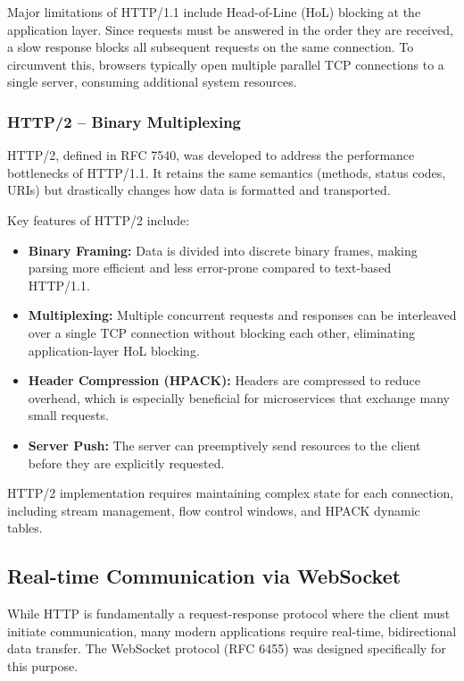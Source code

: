 Major limitations of HTTP/1.1 include Head-of-Line (HoL) blocking at the application layer. Since requests must be answered in the order they are received, a slow response blocks all subsequent requests on the same connection. To circumvent this, browsers typically open multiple parallel TCP connections to a single server, consuming additional system resources.

\subsubsection{HTTP/2 -- Binary Multiplexing}

HTTP/2, defined in RFC 7540, was developed to address the performance bottlenecks of HTTP/1.1. It retains the same semantics (methods, status codes, URIs) but drastically changes how data is formatted and transported.

Key features of HTTP/2 include:
\begin{itemize}
    \item \textbf{Binary Framing:} Data is divided into discrete binary frames, making parsing more efficient and less error-prone compared to text-based HTTP/1.1.
    \item \textbf{Multiplexing:} Multiple concurrent requests and responses can be interleaved over a single TCP connection without blocking each other, eliminating application-layer HoL blocking.
    \item \textbf{Header Compression (HPACK):} Headers are compressed to reduce overhead, which is especially beneficial for microservices that exchange many small requests.
    \item \textbf{Server Push:} The server can preemptively send resources to the client before they are explicitly requested.
\end{itemize}

HTTP/2 implementation requires maintaining complex state for each connection, including stream management, flow control windows, and HPACK dynamic tables.

\subsection{Real-time Communication via WebSocket}

While HTTP is fundamentally a request-response protocol where the client must initiate communication, many modern applications require real-time, bidirectional data transfer. The WebSocket protocol (RFC 6455) was designed specifically for this purpose.

